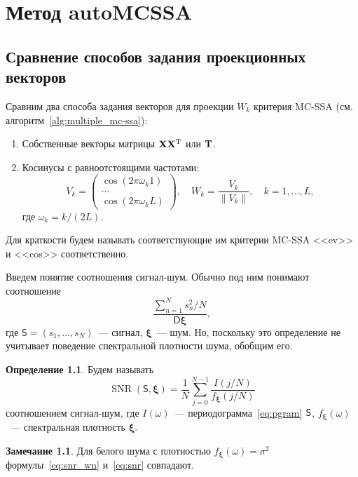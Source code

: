 \documentclass[specialist,
substylefile = spbu_report.rtx,
subf,href,colorlinks=true, 12pt]{disser}
\theoremstyle{definition}
\newtheorem{definition}{Определение}[chapter]
\newtheorem{remark}{Замечание}[chapter]
\begin{document}
\chapter{Метод autoMCSSA}

\section{Сравнение способов задания проекционных векторов}

Сравним два способа задания векторов для проекции $W_k$ критерия MC-SSA (см. алгоритм~\ref{alg:multiple_mc-ssa}):
\begin{enumerate}
	\item Собственные векторы матрицы $\mathbf{X}\mathbf{X}^{\mathrm{T}}$ или $\mathbf{T}$.
	\item Косинусы с равноотстоящими частотами:
	      \[
		      V_k=
		      \begin{pmatrix}
			      \cos(2\pi\omega_k 1) \\
			      \ldots               \\
			      \cos(2\pi\omega_k L)
		      \end{pmatrix},\quad W_k=\frac{V_k}{\|V_k\|},\quad k=1,\ldots,L,
	      \]
	      где $\omega_k=k / (2L)$.
\end{enumerate}
Для краткости будем называть соответствующие им критерии MC-SSA <<ev>> и <<cos>> соответственно.

Введем понятие соотношения сигнал-шум. Обычно под ним понимают соотношение
\begin{equation}
	\frac{\sum\limits_{n=1}^N s^2_n/N}{\mathsf{D}{\bm\xi}},
\end{equation}\label{eq:snr_wn}
где $\mathsf{S}=(s_1,\ldots,s_N)$~--- сигнал, $\bm{\xi}$~--- шум. Но, поскольку это определение не учитывает поведение спектральной плотности шума, обобщим его.

\begin{definition}
	Будем называть
	\begin{equation}\label{eq:snr}
		\operatorname{SNR}(\mathsf{S}, \bm\xi)=\frac1N\sum_{j=0}^{N-1}\frac{I(j/N)}{f_{\bm{\xi}}(j/N)}
	\end{equation}
	соотношением сигнал-шум, где $I(\omega)$~--- периодограмма~\eqref{eq:pgram} $\mathsf{S}$, $f_{\bm\xi}(\omega)$~--- спектральная плотность $\bm\xi$.
\end{definition}

\begin{remark}
	Для белого шума с плотностью $f_{\bm\xi}(\omega)=\sigma^2$ формулы~\eqref{eq:snr_wn} и~\eqref{eq:snr} совпадают.
\end{remark}
\end{document}
